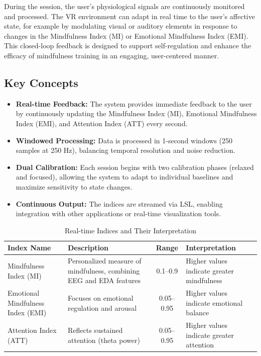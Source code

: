 During the session, the user’s physiological signals are continuously monitored and processed. The VR environment can adapt in real time to the user’s affective state, for example by modulating visual or auditory elements in response to changes in the Mindfulness Index (MI) or Emotional Mindfulness Index (EMI). This closed-loop feedback is designed to support self-regulation and enhance the efficacy of mindfulness training in an engaging, user-centered manner.

\subsection{Key Concepts}
\begin{itemize}
    \item \textbf{Real-time Feedback:} The system provides immediate feedback to the user by continuously updating the Mindfulness Index (MI), Emotional Mindfulness Index (EMI), and Attention Index (ATT) every second.
    \item \textbf{Windowed Processing:} Data is processed in 1-second windows (250 samples at 250 Hz), balancing temporal resolution and noise reduction.
    \item \textbf{Dual Calibration:} Each session begins with two calibration phases (relaxed and focused), allowing the system to adapt to individual baselines and maximize sensitivity to state changes.
    \item \textbf{Continuous Output:} The indices are streamed via LSL, enabling integration with other applications or real-time visualization tools.
\end{itemize}

\begin{table}[h!]
\centering
\caption{Real-time Indices and Their Interpretation}
\begin{tabular}{|l|l|c|l|}
\hline
\textbf{Index Name} & \textbf{Description} & \textbf{Range} & \textbf{Interpretation} \\
\hline
Mindfulness Index (MI) & Personalized measure of mindfulness, combining EEG and EDA features & 0.1--0.9 & Higher values indicate greater mindfulness \\
Emotional Mindfulness Index (EMI) & Focuses on emotional regulation and arousal & 0.05--0.95 & Higher values indicate emotional balance \\
Attention Index (ATT) & Reflects sustained attention (theta power) & 0.05--0.95 & Higher values indicate greater attention \\
\hline
\end{tabular}
\end{table}

